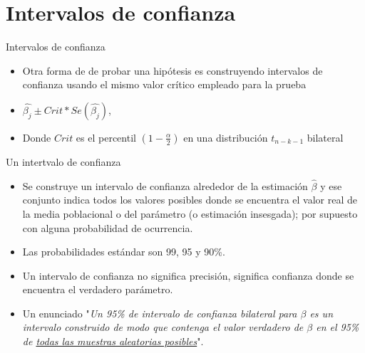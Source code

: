 \section{Intervalos de confianza}
\begin{frame}{Intervalos de confianza}
	\begin{itemize}
		\item Otra forma de de probar una hipótesis es construyendo intervalos de confianza usando el mismo valor crítico empleado para la prueba
		\item $\hat{\beta_{j}}\pm Crit*Se(\hat{\beta_{j}})$,
		\item Donde $Crit$ es el percentil $(1-\frac{\alpha}{2})$ en una distribución $t_{n-k-1}$ bilateral
	\end{itemize}
\end{frame}
\begin{frame}{Un intertvalo de confianza}
	\begin{itemize}
		\item Se construye un intervalo de confianza alrededor de la estimación $\widehat{\beta}$ y ese conjunto indica todos los valores posibles donde se encuentra el valor real de la media poblacional o del parámetro (o estimación insesgada); por supuesto con alguna probabilidad de ocurrencia.
		\item Las probabilidades estándar son 99, 95 y 90\%.
		\item Un intervalo de confianza no significa precisión, significa confianza donde se encuentra el verdadero parámetro.
		\item Un enunciado "\textit{Un 95\% de intervalo de confianza bilateral para $\beta$ es un intervalo construido de modo que contenga el valor verdadero de $\beta$ en el 95\% de \underline{todas las muestras aleatorias posibles}}".
	\end{itemize}
\end{frame}
